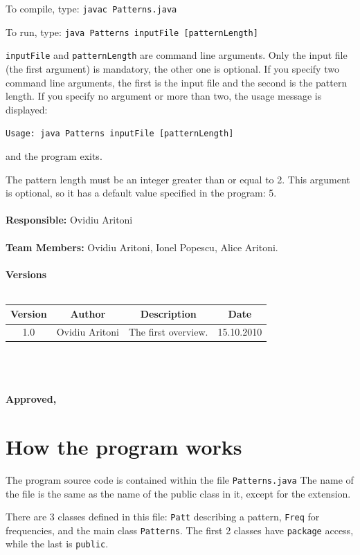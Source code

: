 \documentclass[a4paper,12pt]{article}
\begin{document}
  To compile, type: \verb/javac Patterns.java/

  To run, type: \verb/java Patterns inputFile [patternLength]/

  \verb/inputFile/ and \verb/patternLength/ are command line arguments.
  Only the input file (the first argument) is mandatory, the other one is optional.
  If you specify two command line arguments, the first is the input file
  and the second is the pattern length.
  If you specify no argument or more than two, the usage message is displayed:

  \noindent
  \verb/Usage: java Patterns inputFile [patternLength]/

  \noindent
  and the program exits.

  The pattern length must be an integer greater than or equal to 2.
  This argument is optional, so it has a default value specified in the
  program: 5.
\\
\\
\textbf{Responsible:} Ovidiu Aritoni 
\\
\\
\textbf{Team Members:} Ovidiu Aritoni, Ionel Popescu, Alice Aritoni. 
\\ 
\\
\textbf{Versions}
\\
\\
\begin{tabular}{|c|c|c|c|}
\hline 
Version & Author & Description & Date\tabularnewline
\hline
\hline 
1.0 & Ovidiu Aritoni & The first overview. & 15.10.2010\tabularnewline
\hline
\end{tabular}
\\
\\
\\
\textbf{Approved, }
\newpage 
\tableofcontents
\newpage
\listoffigures
\newpage
\listoftables
\newpage
\section{How the program works}

  The program source code is contained within the file \verb/Patterns.java/
  The name of the file is the same as the name of the public class in it,
  except for the extension.
  
  There are 3 classes defined in this file: \verb/Patt/ describing a pattern,
  \verb/Freq/ for frequencies, and the main class \verb/Patterns/. The first 2 classes
  have \verb/package/ access, while the last is \verb/public/.
  
\end{document}
